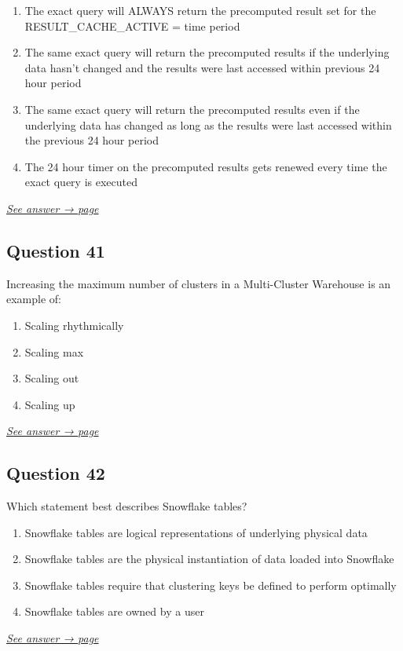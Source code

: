 \documentclass[12pt]{article}
\newcommand{\seeanswer}[1]{%
  \par\smallskip\emph{\hyperref[ans:#1]{See answer → page \pageref{ans:#1}}}%
}
\begin{document}
\begin{enumerate}[label=\Alph*.]
  \item The exact query will ALWAYS return the precomputed result set for the RESULT\_CACHE\_ACTIVE = time period
  \item The same exact query will return the precomputed results if the underlying data hasn’t changed and the results were last accessed within previous 24 hour period
  \item The same exact query will return the precomputed results even if the underlying data has changed as long as the results were last accessed within the previous 24 hour period
  \item The 24 hour timer on the precomputed results gets renewed every time the exact query is executed
\end{enumerate}
\seeanswer{40}

\subsection*{Question 41}\label{q:41}
Increasing the maximum number of clusters in a Multi-Cluster Warehouse is an example of:

\begin{enumerate}[label=\Alph*.]
  \item Scaling rhythmically
  \item Scaling max
  \item Scaling out
  \item Scaling up
\end{enumerate}
\seeanswer{41}

\subsection*{Question 42}\label{q:42}
Which statement best describes Snowflake tables?

\begin{enumerate}[label=\Alph*.]
  \item Snowflake tables are logical representations of underlying physical data
  \item Snowflake tables are the physical instantiation of data loaded into Snowflake
  \item Snowflake tables require that clustering keys be defined to perform optimally
  \item Snowflake tables are owned by a user
\end{enumerate}
\seeanswer{42}
\end{document}
